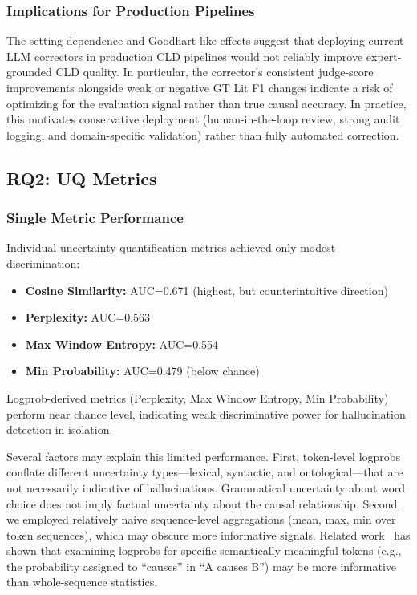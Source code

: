 \subsubsection{Implications for Production Pipelines}

The setting dependence and Goodhart-like effects suggest that deploying current LLM correctors in production CLD pipelines would not reliably improve expert-grounded CLD quality. In particular, the corrector's consistent judge-score improvements alongside weak or negative GT Lit F1 changes indicate a risk of optimizing for the evaluation signal rather than true causal accuracy. In practice, this motivates conservative deployment (human-in-the-loop review, strong audit logging, and domain-specific validation) rather than fully automated correction.

\subsection{RQ2: UQ Metrics}
\label{sec:discussion_rq2}

\subsubsection{Single Metric Performance}

Individual uncertainty quantification metrics achieved only modest discrimination:
\begin{itemize}[noitemsep]
    \item \textbf{Cosine Similarity:} AUC=0.671 (highest, but counterintuitive direction)
    \item \textbf{Perplexity:} AUC=0.563
    \item \textbf{Max Window Entropy:} AUC=0.554
    \item \textbf{Min Probability:} AUC=0.479 (below chance)
\end{itemize}

Logprob-derived metrics (Perplexity, Max Window Entropy, Min Probability) perform near chance level, indicating weak discriminative power for hallucination detection in isolation.

Several factors may explain this limited performance. First, token-level logprobs conflate different uncertainty types---lexical, syntactic, and ontological---that are not necessarily indicative of hallucinations. Grammatical uncertainty about word choice does not imply factual uncertainty about the causal relationship. Second, we employed relatively naive sequence-level aggregations (mean, max, min over token sequences), which may obscure more informative signals. Related work~\citep{Waaijers2024theoraizer} has shown that examining logprobs for specific semantically meaningful tokens (e.g., the probability assigned to ``causes'' in ``A causes B'') may be more informative than whole-sequence statistics.

